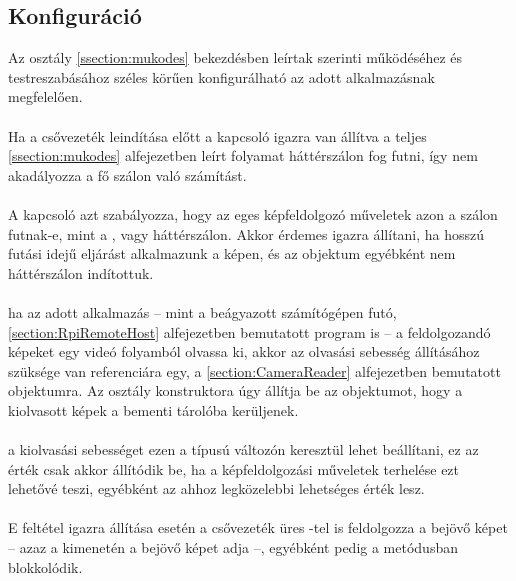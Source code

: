 \subsection{Konfiguráció}

Az osztály \ref{ssection:mukodes} bekezdésben leírtak szerinti működéséhez és testreszabásához széles körűen konfigurálható az adott alkalmazásnak megfelelően.

\paragraph{} Ha a csővezeték leindítása előtt a kapcsoló igazra van állítva a teljes \ref{ssection:mukodes} alfejezetben leírt folyamat háttérszálon fog futni, így nem akadályozza a fő szálon való számítást.

\paragraph{} A kapcsoló azt szabályozza, hogy az eges képfeldolgozó műveletek azon a szálon futnak-e, mint a , vagy háttérszálon. Akkor érdemes igazra állítani, ha hosszú futási idejű eljárást alkalmazunk a képen, és az objektum egyébként nem háttérszálon indítottuk.

\paragraph{} ha az adott alkalmazás -- mint a beágyazott számítógépen futó, \ref{section:RpiRemoteHost} alfejezetben bemutatott program is -- a feldolgozandó képeket egy videó folyamból olvassa ki, akkor az olvasási sebesség állításához szüksége van referenciára egy, a \ref{section:CameraReader} alfejezetben bemutatott objektumra. Az osztály konstruktora úgy állítja be az objektumot, hogy a kiolvasott képek a bementi tárolóba kerüljenek. 

\paragraph{} a kiolvasási sebességet ezen a  típusú változón keresztül lehet beállítani, ez az érték csak akkor állítódik be, ha a képfeldolgozási műveletek terhelése ezt lehetővé teszi, egyébként az ahhoz legközelebbi lehetséges érték lesz.

\paragraph{} E feltétel igazra állítása esetén a csővezeték üres -tel is feldolgozza a bejövő képet -- azaz a kimenetén a bejövő képet adja --, egyébként pedig a  metódusban blokkolódik.

